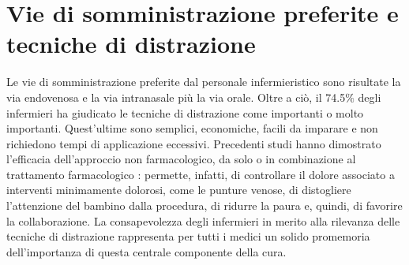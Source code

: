 
\section{Vie di somministrazione preferite e tecniche di distrazione}
Le vie di somministrazione preferite dal personale infermieristico sono risultate la via endovenosa e la via intranasale più la via orale. Oltre a ciò, il 74.5$\%$ degli infermieri ha giudicato le tecniche di distrazione come importanti o molto importanti. Quest'ultime sono semplici, economiche, facili da imparare e non richiedono tempi di applicazione eccessivi. Precedenti studi hanno dimostrato l'efficacia dell'approccio non farmacologico, da solo o in combinazione al trattamento farmacologico \citep{Tibaldo2020, Koller2012}: permette, infatti, di controllare il dolore associato a interventi minimamente dolorosi, come le punture venose, di distogliere l'attenzione del bambino dalla procedura, di ridurre la paura e, quindi, di favorire la collaborazione. La consapevolezza degli infermieri in merito alla rilevanza delle tecniche di distrazione rappresenta per tutti i medici un solido promemoria dell'importanza di questa centrale componente della cura. 

